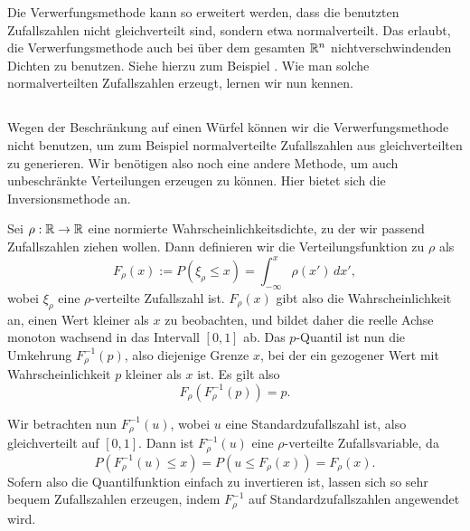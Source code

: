 Die Verwerfungsmethode kann so erweitert werden, dass die benutzten
Zufallszahlen  nicht gleichverteilt sind, sondern etwa
normalverteilt. Das erlaubt, die Verwerfungsmethode auch bei über dem
gesamten $\mathbb{R}^n$ nichtverschwindenden Dichten zu benutzen. Siehe
hierzu zum Beispiel \textcite{knuth81b}. Wie man solche
normalverteilten Zufallszahlen erzeugt, lernen wir nun kennen.

\subsection{}

Wegen der Beschränkung auf einen Würfel können wir die
Verwerfungsmethode nicht benutzen, um zum Beispiel normalverteilte
Zufallszahlen aus gleichverteilten zu generieren. Wir benötigen also
noch eine andere Methode, um auch unbeschränkte Verteilungen erzeugen
zu können. Hier bietet sich die Inversionsmethode an.

Sei $\rho:\mathbb{R}\to \mathbb{R}$ eine normierte Wahrscheinlichkeitsdichte, zu der
wir passend Zufallszahlen ziehen wollen. Dann definieren wir die
Verteilungsfunktion zu $\rho$ als
\begin{equation}
  F_\rho(x) := P(\xi_\rho \le x) = \int_{-\infty}^{x} \rho(x')\, dx',
\end{equation}
wobei $\xi_\rho$ eine $\rho$-verteilte Zufallszahl ist.  $F_\rho(x)$
gibt also die Wahrscheinlichkeit an, einen Wert kleiner als $x$ zu
beobachten, und bildet daher die reelle Achse monoton wachsend in das
Intervall $[0,1]$ ab. Das $p$-Quantil ist nun die Umkehrung
$F_\rho^{-1}(p)$, also diejenige Grenze $x$, bei der ein gezogener
Wert mit Wahrscheinlichkeit $p$ kleiner als $x$ ist. Es gilt also
\begin{equation}
  F_\rho\left(F_\rho^{-1}(p)\right) = p.
\end{equation}

Wir betrachten nun $F_\rho^{-1}(u)$, wobei $u$ eine
Standardzufallszahl ist, also gleichverteilt auf $[0,1]$.  Dann ist
$F_\rho^{-1}(u)$ eine $\rho$-verteilte Zufallsvariable, da
\begin{equation}
  P(F_\rho^{-1}(u) \le x) = P(u \le F_\rho(x)) = F_\rho(x).
\end{equation}
Sofern also die Quantilfunktion einfach zu invertieren ist, lassen
sich so sehr bequem Zufallszahlen erzeugen, indem $F_\rho^{-1}$ auf
Standardzufallszahlen angewendet wird.

\subsubsection{}

